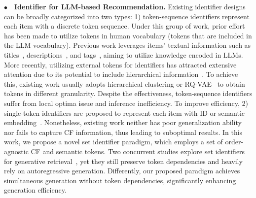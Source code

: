 \vspace{2pt}
\noindent$\bullet\quad$\textbf{Identifier for LLM-based Recommendation.} 
Existing identifier designs can be broadly categorized into two types: 
1) token-sequence identifiers represent each item with a discrete token sequence. 
Under this group of work, 
prior effort has been made to utilize tokens in human vocabulary (\ie tokens that are included in the LLM vocabulary). 
Previous work leverages items' textual information such as titles~\cite{bao2023bi}, descriptions~\cite{cui2022m6}, and tags~\cite{tan2024idgenrec}, aiming to utilize knowledge encoded in LLMs. 
More recently, utilizing external tokens for identifiers has attracted extensive attention due to its potential to include hierarchical information~\cite{zhu2024cost,zheng2024adapting,wang2024content}. 
To achieve this, existing work usually adopts hierarchical clustering or RQ-VAE~\cite{lee2022autoregressive} to obtain tokens in different granularity. 
Despite the effectiveness, token-sequence identifiers suffer from local optima issue and inference inefficiency. 
To improve efficiency, 
2) single-token identifiers are proposed to represent each item with ID or semantic embedding~\cite{li2023e4srec,wang2024rethinking}. 
Nonetheless, existing work neither has poor generalization ability nor fails to capture CF information, thus leading to suboptimal results. 
In this work, we propose a novel set identifier paradigm, which employs a set of order-agnostic CF and semantic tokens.  
Two concurrent studies explore set identifiers for generative retrieval~\cite{zeng2024planning,zhang2024generative}, yet they still preserve token dependencies and heavily rely on autoregressive generation. Differently, our proposed paradigm achieves simultaneous generation without token dependencies, significantly enhancing generation efficiency.